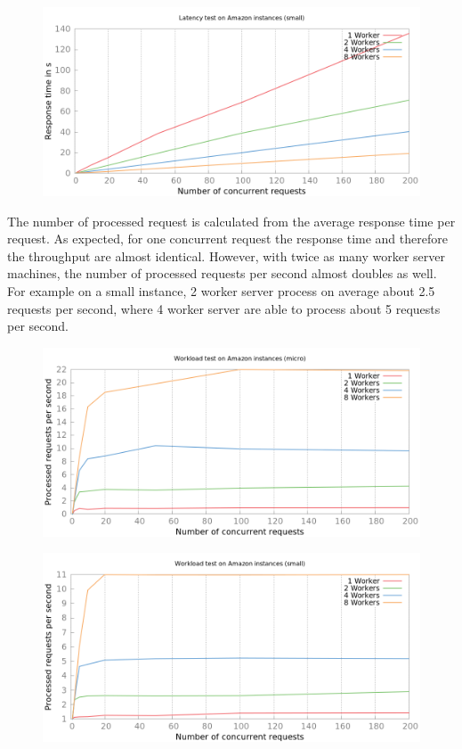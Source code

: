 \documentclass[paper=a4, fontsize=11pt]{scrartcl} %
\numberwithin{equation}{section} %
\numberwithin{figure}{section} %
\numberwithin{table}{section} %
\begin{document}
\begin{figure}[h!]
\includegraphics[width=\columnwidth]{../plot/latency_fixed_small.png}
\end{figure}

The number of processed request is calculated from the average response time per request. As expected, for one concurrent request the response time and therefore the throughput are almost identical. However, with twice as many worker server machines, the number of processed requests per second almost doubles as well. For example on a small instance, 2 worker server process on average about 2.5 requests per second, where 4 worker server are able to process about 5 requests per second.

\begin{figure}[h!]
\includegraphics[width=\columnwidth]{../plot/workload.png}
\end{figure}

\begin{figure}[h!]
\includegraphics[width=\columnwidth]{../plot/workload_small.png}
\end{figure}
\end{document}
